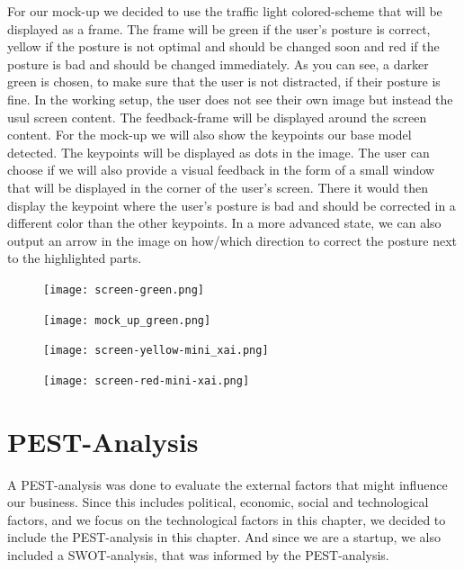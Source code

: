 For our mock-up we decided to use the traffic light colored-scheme that will be displayed as a frame. 
The frame will be green if the user's posture is correct, yellow if the posture is not optimal and should be changed soon and red if the posture is bad and should be changed immediately.
As you can see, a darker green is chosen, to make sure that the user is not distracted, if their posture is fine.
In the working setup, the user does not see their own image but instead the usul screen content. The feedback-frame will be displayed around the screen content. 
For the mock-up we will also show the keypoints our base model detected. The keypoints will be displayed as dots in the image. The user can choose if we will also provide a visual feedback in the form of a small window that will be displayed in the corner of the user's screen.
There it would then display the keypoint where the user's posture is bad and should be corrected in a different color than the other keypoints. 
In a more advanced state, we can also output an arrow in the image on how/which direction to correct the posture next to the highlighted parts.

\begin{figure}[ht]
    \texttt{[image: screen-green.png]}
\end{figure}

\begin{figure}[ht]
    \texttt{[image: mock\_up\_green.png]}
\end{figure}

\begin{figure}[ht]
    \texttt{[image: screen-yellow-mini\_xai.png]}
\end{figure}

\begin{figure}[ht]
    \texttt{[image: screen-red-mini-xai.png]}
\end{figure}




\section{PEST-Analysis}

A PEST-analysis was done to evaluate the external factors that might influence our business. Since this includes political, economic, social and technological factors, 
and we focus on the technological factors in this chapter, we decided to include the PEST-analysis in this chapter. And since we are a startup, we also included a 
SWOT-analysis, that was informed by the PEST-analysis. 

